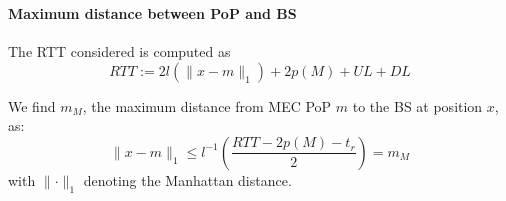 \documentclass[aspectratio=169]{beamer}
\begin{document}
\begin{frame}
    \frametitle{\secname}
    \framesubtitle{Maximum distance between PoP and BS}


    The RTT considered is computed as
    \begin{equation}
        RTT := 2 l\left(\lVert x - m \rVert_1 \right) + 2 p(M) + UL + DL
        \label{eq:rtt}
    \end{equation}


    We find $m_M$, the maximum distance from MEC PoP $m$ to the BS at position $x$, as:
    \begin{equation}
        \lVert x-m \rVert_1 \le l^{-1}\left( \frac{RTT - 2p(M) - t_r}{2} \right)  = m_M
        \label{eq:max-dis}
    \end{equation}
    with $\lVert \cdot \rVert_1$ denoting the Manhattan distance.
\end{frame}
\end{document}
